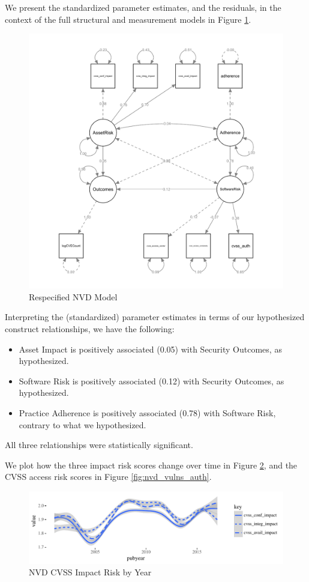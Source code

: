 We present the standardized parameter estimates, and the residuals, in the context of the full structural and measurement models in Figure \ref{fig:nvd_model_respecified_estimates}. 

\begin{figure}
	\centering
	\includegraphics[width=.6\textwidth]{NVD_Respecified_SEM_Model.pdf}
	\caption{Respecified NVD Model}
	\label{fig:nvd_model_respecified_estimates}
\end{figure}

Interpreting the (standardized) parameter estimates in terms of our hypothesized construct relationships, we have the following:
\begin{itemize}
	\item  Asset Impact is positively associated (0.05) with Security Outcomes, as hypothesized.
	\item Software Risk is positively associated (0.12) with Security Outcomes, as hypothesized. 
	\item Practice Adherence is positively associated (0.78) with Software Risk, contrary to what we hypothesized. 
\end{itemize}	
All three relationships were statistically significant. 

We plot how the three impact risk scores change over time in Figure \ref{fig:nvd_vulns_impact}, and the CVSS access risk scores in Figure \ref{fig:nvd_vulns_auth}. 	
		
\begin{figure}
	\centering
	\includegraphics[width=\columnwidth]{nvd_cvss_impact}
	\caption{NVD CVSS Impact Risk by Year}
	\label{fig:nvd_vulns_impact}
\end{figure}

